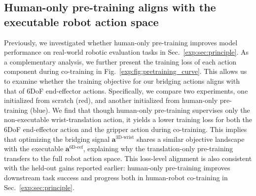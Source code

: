 \documentclass{llmxive}
\begin{document}
\begin{table}[htbp]
\centering
{}
\label{exp:tab:sec5.5}
\caption{
    \textbf{Ablation of the bridging objective on robot data.}
    During co-training, it is essential to also supervise the bridging action on robot data for manipulation skill transfer.
}
\end{table}






\subsection{Human-only pre-training aligns with the executable robot action space}
\label{exp:sec:alignment}

Previously, we investigated whether human-only pre-training improves model performance on real-world robotic evaluation tasks in Sec.~\ref{exp:sec:principle}.
% 
As a complementary analysis, we further present the training loss of each action component during co-training in Fig.~\ref{exp:fig:pretraining_curve}. 
% 
This allows us to examine whether the training objective for our bridging actions aligns with that of 6DoF end-effector actions.
% 
Specifically, we compare two experiments, one initialized from scratch (red), and another initialized from human-only pre-training (blue).
% 
We find that though human-only pre-training supervises only the non-executable wrist-translation action, it yields a lower training loss for both the 6DoF end-effector action and the gripper action during co-training.
% 
This implies that optimizing the bridging signal $\mathbf{a}^{\text{3D-wrist}}$ shares a similar objective landscape with the executable $\mathbf{a}^{\text{6D-eef}}$, explaining why the translation-only pre-training transfers to the full robot action space.
% 
This loss-level alignment is also consistent with the held-out gains reported earlier: human-only pre-training improves downstream task success and progress both in human-robot co-training in Sec.~\ref{exp:sec:principle}.
\end{document}
